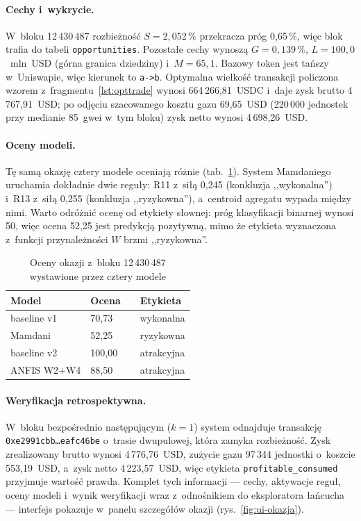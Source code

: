 \paragraph{Cechy i~wykrycie.} W~bloku 12\,430\,487 rozbieżność $S=2{,}052\,\%$ przekracza próg
0,65\,\%, więc blok trafia do tabeli \texttt{opportunities}. Pozostałe cechy wynoszą
$G=0{,}139\,\%$, $L=100{,}0$~mln~USD (górna granica dziedziny) i~$M=65{,}1$. Bazowy token jest
tańszy w~Uniswapie, więc kierunek to \texttt{a->b}. Optymalna wielkość transakcji policzona
wzorem z~fragmentu~\ref{lst:opttrade} wynosi 664\,266,81~USDC i~daje zysk brutto 4\,767,91~USD;
po odjęciu szacowanego kosztu gazu 69,65~USD (220\,000 jednostek przy medianie 85~gwei w~tym
bloku) zysk netto wynosi 4\,698,26~USD.

\paragraph{Oceny modeli.} Tę samą okazję cztery modele oceniają różnie
(tab.~\ref{tab:case-scores}). System Mamdaniego uruchamia dokładnie dwie reguły: R11 z~siłą
0,245 (konkluzja ,,wykonalna'') i~R13 z~siłą 0,255 (konkluzja ,,ryzykowna''), a~centroid
agregatu wypada między nimi. Warto odróżnić ocenę od etykiety słownej: próg klasyfikacji
binarnej wynosi 50, więc ocena 52,25 jest predykcją pozytywną, mimo że etykieta wyznaczona
z~funkcji przynależności $W$ brzmi ,,ryzykowna''.

\begin{table}[H]\centering\small
\caption{Oceny okazji z~bloku 12\,430\,487 wystawione przez cztery modele}
\label{tab:case-scores}
\begin{tabular}{llr l}
\toprule
Model & Ocena & & Etykieta \\
\midrule
baseline v1      & 70,73  & & wykonalna \\
Mamdani          & 52,25  & & ryzykowna \\
baseline v2      & 100,00 & & atrakcyjna \\
ANFIS W2+W4      & 88,50  & & atrakcyjna \\
\bottomrule
\end{tabular}
\end{table}

\paragraph{Weryfikacja retrospektywna.} W~bloku bezpośrednio następującym ($k=1$) system
odnajduje transakcję \texttt{0xe2991cbb\ldots eafc46be} o~trasie dwupulowej, która zamyka
rozbieżność. Zysk zrealizowany brutto wynosi 4\,776,76~USD, zużycie gazu 97\,344 jednostki
o~koszcie 553,19~USD, a~zysk netto 4\,223,57~USD, więc etykieta
\texttt{profitable\_consumed} przyjmuje wartość prawda. Komplet tych informacji --- cechy,
aktywacje reguł, oceny modeli i~wynik weryfikacji wraz z~odnośnikiem do eksploratora łańcucha
--- interfejs pokazuje w~panelu szczegółów okazji (rys.~\ref{fig:ui-okazja}).

